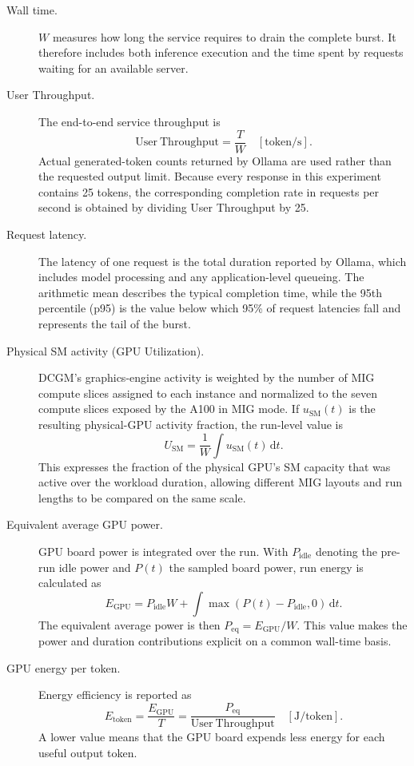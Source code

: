 \begin{description}
    \item[Wall time.] $W$ measures how long the service requires to drain the complete burst. It therefore includes both inference execution and the time spent by requests waiting for an available server.
    \item[User Throughput.] The end-to-end service throughput is
    \begin{equation}
        \mathrm{User\ Throughput}=\frac{T}{W}\quad [\mathrm{token/s}].
    \end{equation}
    Actual generated-token counts returned by Ollama are used rather than the requested output limit. Because every response in this experiment contains 25 tokens, the corresponding completion rate in requests per second is obtained by dividing User Throughput by 25.
    \item[Request latency.] The latency of one request is the total duration reported by Ollama, which includes model processing and any application-level queueing. The arithmetic mean describes the typical completion time, while the 95th percentile (p95) is the value below which 95\% of request latencies fall and represents the tail of the burst.
    \item[Physical SM activity (GPU Utilization).] DCGM's graphics-engine activity is weighted by the number of MIG compute slices assigned to each instance and normalized to the seven compute slices exposed by the A100 in MIG mode. If $u_{\mathrm{SM}}(t)$ is the resulting physical-GPU activity fraction, the run-level value is
    \begin{equation}
        U_{\mathrm{SM}}=\frac{1}{W}\int u_{\mathrm{SM}}(t)\,\mathrm{d}t.
    \end{equation}
    This expresses the fraction of the physical GPU's SM capacity that was active over the workload duration, allowing different MIG layouts and run lengths to be compared on the same scale.
    \item[Equivalent average GPU power.] GPU board power is integrated over the run. With $P_{\mathrm{idle}}$ denoting the pre-run idle power and $P(t)$ the sampled board power, run energy is calculated as
    \begin{equation}
        E_{\mathrm{GPU}}=P_{\mathrm{idle}}W+\int \max\!\left(P(t)-P_{\mathrm{idle}},0\right)\,\mathrm{d}t.
    \end{equation}
    The equivalent average power is then $P_{\mathrm{eq}}=E_{\mathrm{GPU}}/W$. This value makes the power and duration contributions explicit on a common wall-time basis.
    \item[GPU energy per token.] Energy efficiency is reported as
    \begin{equation}
        E_{\mathrm{token}}=\frac{E_{\mathrm{GPU}}}{T}=\frac{P_{\mathrm{eq}}}{\mathrm{User\ Throughput}}\quad [\mathrm{J/token}].
    \end{equation}
    A lower value means that the GPU board expends less energy for each useful output token.
\end{description}

